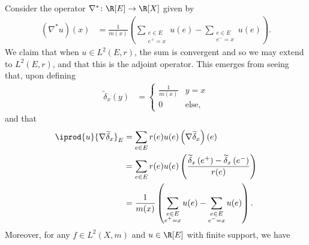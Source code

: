 \documentclass[10pt]{mypackage}
\begin{document}
Consider the operator $\nabla^{\ast}\colon \R[E]\to \R[X]$ given by
\begin{align*}
  \left( \nabla^{\ast}u \right)(x) &= \frac{1}{m(x)} \left( \sum_{\substack{e\in E\\e^+ = x}}u(e) - \sum_{\substack{e\in E \\ e^- = x}}u(e) \right).
\end{align*}
We claim that when $u\in L^2\left( E,r \right)$, the sum is convergent and so we may extend to $L^2\left( E,r \right)$, and that this is the adjoint operator. This emerges from seeing that, upon defining
\begin{align*}
  \widetilde{\delta}_x\left( y \right) &= \begin{cases}
    \frac{1}{m(x)} & y = x\\
    0 & \text{else},
  \end{cases}
\end{align*}
and that
\begin{align*}
  \iprod{u}{\nabla \widetilde{\delta}_x}_E &= \sum_{e\in E}r(e)u(e) \left( \nabla \widetilde{\delta}_x \right)(e)\\
                                           &= \sum_{e\in E} r(e)u(e) \left( \frac{\widetilde{\delta}_x\left( e^+ \right) - \widetilde{\delta}_x\left( e^- \right)}{r(e)} \right)\\
                                           &= \frac{1}{m(x)}\left( \sum_{\substack{e\in E\\e^+ = x}}u(e) - \sum_{\substack{e\in E \\ e^{-} = x}}u(e) \right).
\end{align*}
Moreover, for any $f\in L^2\left( X,m \right)$ and $u\in \R[E]$ with finite support, we have
\end{document}
